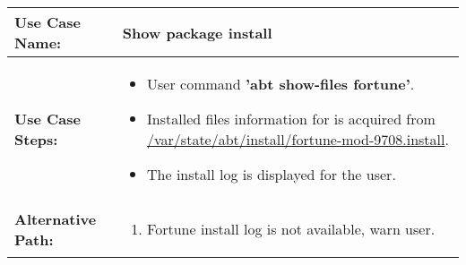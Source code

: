 \medskip

\begin{tabularx}{\linewidth}{|l|X|}
\hline
\textbf{Use Case Name:} & \textbf{Show package install} \\
\hline
\textbf{Use Case Steps:} & 
\begin{minipage}{\linewidth} 
  \vspace{0.05em}
  \begin{itemize}
    \item User command \textbf{'abt show-files fortune'}.
    \item Installed files information for is acquired from \url{/var/state/abt/install/fortune-mod-9708.install}.
    \item The install log is displayed for the user.
  \end{itemize}
  \vspace{0.05em}
\end{minipage}
\\
\hline 
\textbf{Alternative Path:} &
\begin{minipage}{\linewidth}
  \vspace{0.05em} 
  \begin{enumerate}
    \item Fortune install log is not available, warn user.
  \end{enumerate}
  \vspace{0.05em} 
\end{minipage}
\\
\hline
\end{tabularx}